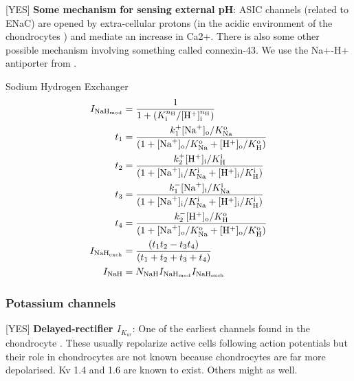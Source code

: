 [YES] {\bf Some mechanism for sensing external pH}: ASIC channels
(related to ENaC) are opened by extra-cellular protons (in the acidic
environment of the chondrocytes ) and mediate an increase in
Ca2+. There is also some other possible mechanism involving something
called connexin-43. We use the Na+-H+ antiporter from
\citet{Halletal1996,Wilkinsetal2000}.


Sodium Hydrogen Exchanger \citep[Eq. 2, pp. 2675]{Chaetal2009}
\begin{equation}
  \begin{split}
    I_{{\rm NaH}_{\rm mod}} & = \frac{1}{1 + (K_{\rm i}^{n_{\rm
          H}}/[{\rm H}^{+}]_{\rm i}^{n_{\rm H}})}\\
    t_{1} & = \frac{k_{1}^{+} [{\rm Na}^{+}]_{\rm o}/K_{\rm Na}^{\rm
        o}} {(1 + [{\rm Na}^{+}]_{\rm o}/K_{\rm Na}^{\rm o} + [{\rm
        H}^{+}]_{\rm o} /K_{\rm H}^{\rm o})}\\
    t_{2} & = \frac{k_{2}^{+} [{\rm H}^{+}]_{\rm i}/K_{\rm H}^{\rm i}}
    {(1 + [{\rm Na}^{+}]_{\rm i}/K_{\rm Na}^{\rm i} + [{\rm
        H}^{+}]_{\rm i}/K_{\rm H}^{\rm i})}\\
    t_{3} & = \frac{k_{1}^{-} [{\rm Na}^{+}]_{\rm i}/K_{\rm Na}^{\rm
        i}} {(1 + [{\rm Na}^{+}]_{\rm i}/K_{\rm Na}^{\rm i} + [{\rm
        H}^{+}]_{\rm i} /K_{\rm H}^{\rm i})}\\
    t_{4} & = \frac{k_{2}^{-} [{\rm H}^{+}]_{\rm o}/K_{\rm H}^{\rm
        o}} {(1 + [{\rm Na}^{+}]_{\rm o}/K_{\rm Na}^{\rm o} + [{\rm
        H}^{+}]_{\rm o} /K_{\rm H}^{\rm o})}\\
    I_{{\rm NaH}_{\rm exch}} & = \frac{(t_1 t_2 - t_3 t_4)}
    {(t_1 + t_2 + t_3 + t_4)}\\
    I_{\rm NaH} & = N_{\rm NaH} I_{\rm NaH_{\rm mod}}
    I_{\rm NaH_{\rm exch}}
  \end{split}
\end{equation}

\subsubsection*{Potassium channels}
\label{sec:potassium-channels}

[YES] {\bf Delayed-rectifier $I_{K_{ur}}$}: One of the earliest channels
found in the chondrocyte \citep{Walshetal1992, Sugimotoetal1996,
  Mobasherietal2005}. These usually repolarize active cells following
action potentials but their role in chondrocytes are not known because
chondrocytes are far more depolarised. Kv 1.4 and 1.6
\citep{Clarketal2010, Mobasherietal2005} are known to exist. Others
might as well.


